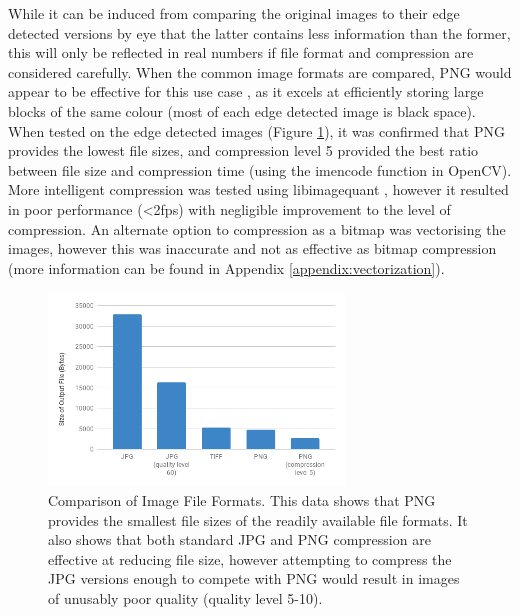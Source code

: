 While it can be induced from comparing the original images to their edge detected versions by eye that the latter contains less information than the former, this will only be reflected in real numbers if file format and compression are considered carefully. When the common image formats are compared, PNG would appear to be effective for this use case \cite{aguilera2006comparison}, as it excels at efficiently storing large blocks of the same colour (most of each edge detected image is black space). When tested on the edge detected images (Figure \ref{fig:compress}), it was confirmed that PNG provides the lowest file sizes, and compression level 5 provided the best ratio between file size and compression time (using the imencode function in OpenCV). More intelligent compression was tested using libimagequant \cite{libimagequant}, however it resulted in poor performance (\textless2fps) with negligible improvement to the level of compression. An alternate option to compression as a bitmap was vectorising the images, however this was inaccurate and not as effective as bitmap compression (more information can be found in Appendix \ref{appendix:vectorization}).

\begin{figure}[H]
    \begin{center}
      \includegraphics[width=0.7\textwidth]{Figures/compression.png}
      \caption[Comparison of Image File Formats]{Comparison of Image File Formats. This data shows that PNG provides the smallest file sizes of the readily available file formats. It also shows that both standard JPG and PNG compression are effective at reducing file size, however attempting to compress the JPG versions enough to compete with PNG would result in images of unusably poor quality (quality level 5-10).}
      \label{fig:compress}
    \end{center}
\end{figure}

